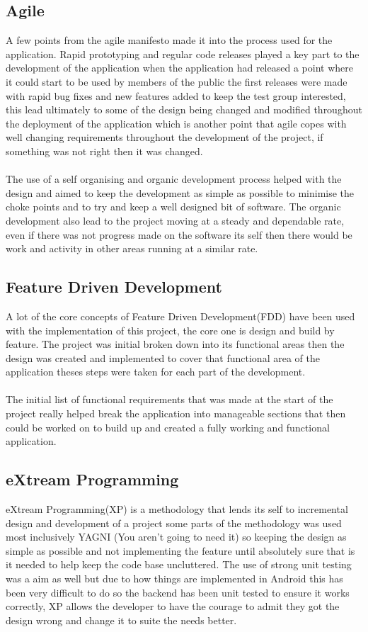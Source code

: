 \subsection{Agile}

A few points from the agile manifesto made it into the process used for the application. Rapid prototyping and regular code releases played a key part to the development of the application when the application had released a point where it could start to be used by members of the public the first releases were made with rapid bug fixes and new features added to keep the test group interested, this lead ultimately to some of the design being changed and modified throughout the deployment of the application which is another point that agile copes with well changing requirements throughout the development of the project, if something was not right then it was changed.\\
\\
The use of a self organising and organic development process helped with the design and aimed to keep the development as simple as possible to minimise the choke points and to try and keep a well designed bit of software. The organic development also lead to the project moving at a steady and dependable rate, even if there was not progress made on the software its self then there would be work and activity in other areas running at a similar rate.

\subsection{Feature Driven Development}

A lot of the core concepts of Feature Driven Development(FDD) have been used with the implementation of this project, the core one is design and build by feature. The project was initial broken down into its functional areas then the design was created and implemented to cover that functional area of the application theses steps were taken for each part of the development.\\
\\
The initial list of functional requirements that was made at the start of the project really helped break the application into manageable sections that then could be worked on to build up and created a fully working and functional application.

\subsection{eXtream Programming}

eXtream Programming(XP) is a methodology that lends its self to incremental design and development of a project some parts of the methodology was used most inclusively YAGNI (You aren't going to need it) so keeping the design as simple as possible and not implementing the feature until absolutely sure that is it needed to help keep the code base uncluttered. The use of strong unit testing was a aim as well but due to how things are implemented in Android this has been very difficult to do so the backend has been unit tested to ensure it works correctly, XP allows the developer to have the courage to admit they got the design wrong and change it to suite the needs better.
